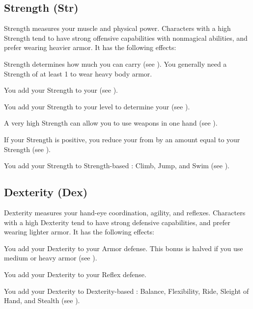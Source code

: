   \subsection{Strength (Str)}\label{Strength}
    {
      Strength measures your muscle and physical power.
      Characters with a high Strength tend to have strong offensive capabilities with nonmagical abilities, and prefer wearing heavier armor.
      It has the following effects:
      \begin{raggeditemize}
        \item Strength determines how much you can carry (see ).
          You generally need a Strength of at least 1 to wear heavy body armor.
        \item You add your Strength to your  (see ).
        \item You add your Strength to your level to determine your  (see ).
        \item A very high Strength can allow you to use  weapons in one hand (see ).
        \item If your Strength is positive, you reduce your  from  by an amount equal to your Strength (see ).
        \item You add your Strength to Strength-based : Climb, Jump, and Swim (see ).
      \end{raggeditemize}
    }

  \subsection{Dexterity (Dex)}\label{Dexterity}
    {
      Dexterity measures your hand-eye coordination, agility, and reflexes.
      Characters with a high Dexterity tend to have strong defensive capabilities, and prefer wearing lighter armor.
      It has the following effects:
      \begin{raggeditemize}
        \item You add your Dexterity to your Armor defense.
          This bonus is halved if you use medium or heavy armor (see ).
        \item You add your Dexterity to your Reflex defense.
        \item You add your Dexterity to Dexterity-based : Balance, Flexibility, Ride, Sleight of Hand, and Stealth (see ).
      \end{raggeditemize}
    }

